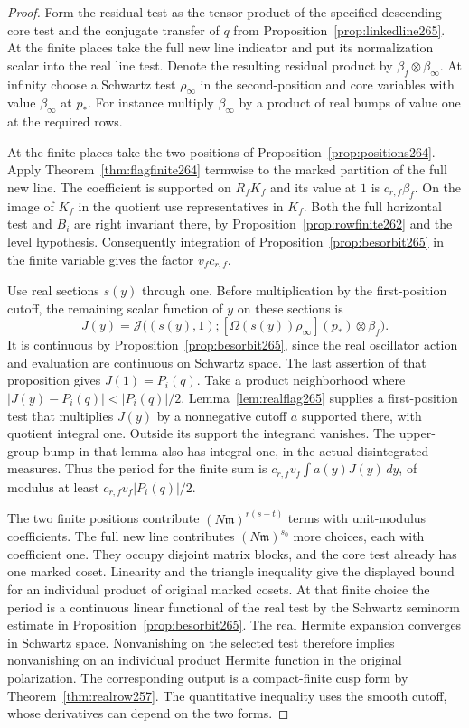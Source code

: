 \documentclass[a4paper,11pt]{article}
\theoremstyle{definition}
\theoremstyle{remark}
\numberwithin{equation}{section}
\begin{document}
\begin{proof}
Form the residual test as the tensor product of the specified
descending core test and the conjugate transfer of \(q\) from
Proposition~\ref{prop:linkedline265}. At the finite places
take the full new line indicator and put its normalization
scalar into the real line test. Denote the resulting residual
product by \(\beta_f\otimes\beta_\infty\). At infinity choose
a Schwartz test \(\rho_\infty\) in the second-position and
core variables with value \(\beta_\infty\) at \(p_*\).
For instance multiply \(\beta_\infty\) by a product of real
bumps of value one at the required rows.

At the finite places take the two positions of
Proposition~\ref{prop:positions264}. Apply
Theorem~\ref{thm:flagfinite264} termwise to the marked
partition of the full new line. The coefficient is supported
on \(R_fK_f\) and its value at \(1\) is \(c_{r,f}\beta_f\).
On the image of \(K_f\) in the quotient use representatives
in \(K_f\). Both the full horizontal test and \(B_i\) are
right invariant there, by Proposition~\ref{prop:rowfinite262}
and the level hypothesis. Consequently integration of
Proposition~\ref{prop:besorbit265} in the finite variable
gives the factor \(v_f c_{r,f}\).

Use real sections \(s(y)\) through one. Before multiplication
by the first-position cutoff, the remaining scalar function of
\(y\) on these sections is
\[
   J(y)=\mathcal J\big((s(y),1);
          [\Omega(s(y))\rho_\infty](p_*)\otimes\beta_f\big).
\]
It is continuous by Proposition~\ref{prop:besorbit265},
since the real oscillator action and evaluation are continuous
on Schwartz space. The last assertion of that proposition gives
\(J(1)=P_i(q)\). Take a product neighborhood where
\(|J(y)-P_i(q)|<|P_i(q)|/2\). Lemma~\ref{lem:realflag265}
supplies a first-position test that multiplies \(J(y)\) by a
nonnegative cutoff \(a\) supported there, with quotient integral
one. Outside its support the integrand vanishes. The upper-group
bump in that lemma also has integral one, in the actual
disintegrated measures. Thus the period for the finite sum
is \(c_{r,f}v_f\int a(y)J(y)\,dy\), of modulus at least
\(c_{r,f}v_f|P_i(q)|/2\).

The two finite positions contribute \((N\mathfrak m)^{r(s+t)}\)
terms with unit-modulus coefficients. The full new line
contributes \((N\mathfrak m)^{s_0}\) more choices, each with
coefficient one. They occupy disjoint matrix blocks, and the core
test already has one marked coset. Linearity and the triangle
inequality give the displayed bound for an individual product
of original marked cosets. At that finite choice the period
is a continuous linear functional of the real test by the
Schwartz seminorm estimate in Proposition~\ref{prop:besorbit265}.
The real Hermite expansion converges in Schwartz space.
Nonvanishing on the selected test therefore implies nonvanishing
on an individual product Hermite function in the original
polarization. The corresponding output is a compact-finite
cusp form by Theorem~\ref{thm:realrow257}. The quantitative
inequality uses the smooth cutoff, whose derivatives can depend
on the two forms.


\end{proof}
\end{document}
